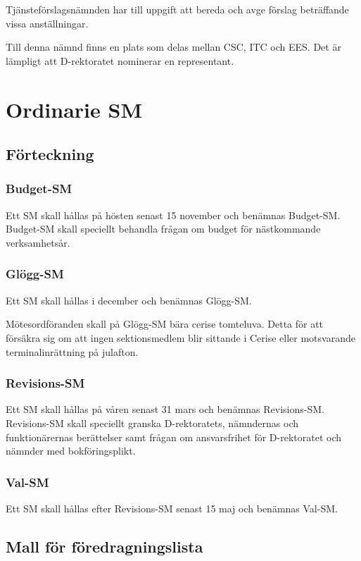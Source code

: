 \documentclass[a4paper,12pt]{article}
\begin{document}
Tjänsteförslagsnämnden har till uppgift att bereda och avge förslag beträffande vissa anställningar.

Till denna nämnd finns en plats som delas mellan CSC, ITC och EES. Det är lämpligt att D-rektoratet nominerar en representant.

\section{Ordinarie SM}

\subsection{Förteckning}

\subsubsection{Budget-SM}

Ett SM skall hållas på hösten senast 15 november och benämnas Budget-SM. Budget-SM skall speciellt behandla frågan om budget för nästkommande verksamhetsår.

\subsubsection{Glögg-SM}

Ett SM skall hållas i december och benämnas Glögg-SM.

Mötesordföranden skall på Glögg-SM bära cerise tomteluva. Detta för att försäkra sig om att ingen sektionsmedlem blir sittande i Cerise eller motsvarande terminalinrättning på julafton.

\subsubsection{Revisions-SM}

Ett SM skall hållas på våren senast 31 mars och benämnas Revisions-SM. Revisions-SM skall speciellt granska D-rektoratets, nämndernas och funktionärernas berättelser samt frågan om ansvarsfrihet för D-rektoratet och nämnder med bokföringsplikt.

\subsubsection{Val-SM}

Ett SM skall hållas efter Revisions-SM senast 15 maj och benämnas Val-SM.

\subsection{Mall för föredragningslista}
\end{document}
